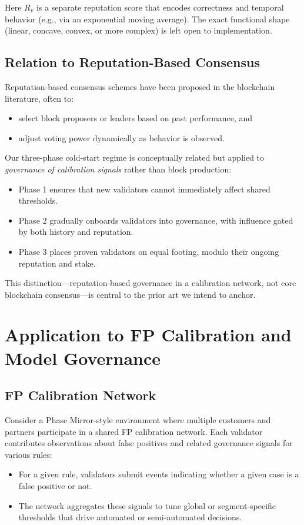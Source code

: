 \documentclass[11pt]{article}
\begin{document}
Here \(R_v\) is a separate reputation score that encodes correctness and temporal behavior (e.g., via an exponential moving average).
The exact functional shape (linear, concave, convex, or more complex) is left open to implementation.

\subsection{Relation to Reputation-Based Consensus}

Reputation-based consensus schemes have been proposed in the blockchain literature, often to:
\begin{itemize}[leftmargin=*]
  \item select block proposers or leaders based on past performance, and
  \item adjust voting power dynamically as behavior is observed.
\end{itemize}

Our three-phase cold-start regime is conceptually related but applied to \emph{governance of calibration signals} rather than block production:
\begin{itemize}[leftmargin=*]
  \item Phase 1 ensures that new validators cannot immediately affect shared thresholds.
  \item Phase 2 gradually onboards validators into governance, with influence gated by both history and reputation.
  \item Phase 3 places proven validators on equal footing, modulo their ongoing reputation and stake.
\end{itemize}

This distinction---reputation-based governance in a calibration network, not core blockchain consensus---is central to the prior art we intend to anchor.

\section{Application to FP Calibration and Model Governance}

\subsection{FP Calibration Network}

Consider a Phase Mirror-style environment where multiple customers and partners participate in a shared FP calibration network.
Each validator contributes observations about false positives and related governance signals for various rules:
\begin{itemize}[leftmargin=*]
  \item For a given rule, validators submit events indicating whether a given case is a false positive or not.
  \item The network aggregates these signals to tune global or segment-specific thresholds that drive automated or semi-automated decisions.
\end{itemize}
\end{document}
